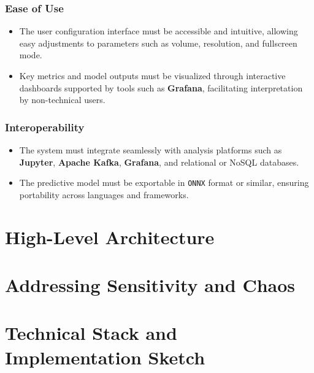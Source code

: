 \documentclass{article}
\newcommand{\reqnumNF}[1]{\textbf{\underline{RNF-#1}}}
\begin{document}
\subsubsection{Ease of Use}
\begin{itemize}
    \item[\reqnumNF{007}] The user configuration interface must be accessible and intuitive, allowing easy adjustments to parameters such as volume, resolution, and fullscreen mode.
    \item[\reqnumNF{008}] Key metrics and model outputs must be visualized through interactive dashboards supported by tools such as \textbf{Grafana}, facilitating interpretation by non-technical users.
\end{itemize}

\subsubsection{Interoperability}
\begin{itemize}
    \item[\reqnumNF{009}] The system must integrate seamlessly with analysis platforms such as \textbf{Jupyter}, \textbf{Apache Kafka}, \textbf{Grafana}, and relational or NoSQL databases.
    \item[\reqnumNF{010}] The predictive model must be exportable in \texttt{ONNX} format or similar, ensuring portability across languages and frameworks.
\end{itemize}
    

\section{High-Level Architecture}

\section{Addressing Sensitivity and Chaos}

\section{Technical Stack and Implementation Sketch}
\end{document}
